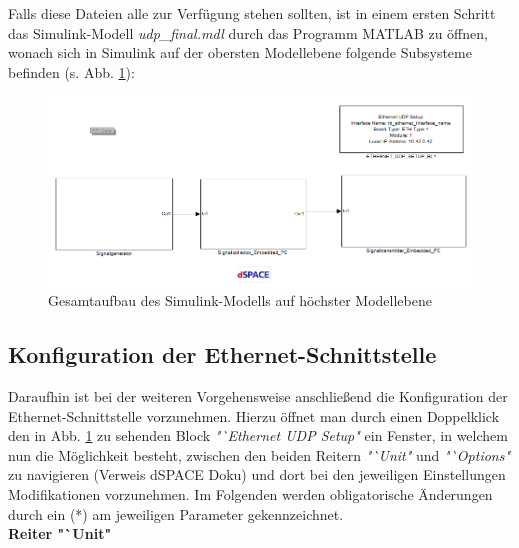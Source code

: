 \documentclass[fontsize = 12pt, paper = a4]{scrreprt}
\begin{document}
Falls diese Dateien alle zur Verfügung stehen sollten, ist in einem ersten Schritt das Simulink-Modell \textit{udp\_final.mdl} durch das Programm MATLAB zu öffnen, wonach sich in Simulink auf der obersten Modellebene  folgende Subsysteme befinden (s. Abb. \ref{topmodell}):

\begin{figure}[h]
\centering
\includegraphics[scale = 0.65]{topmodell}
\caption[Gesamtaufbau Simulink-Modell]{Gesamtaufbau des Simulink-Modells auf höchster Modellebene}
\label{topmodell}
\end{figure} 

\newpage


\subsection{Konfiguration der Ethernet-Schnittstelle}

Daraufhin ist bei der weiteren Vorgehensweise anschließend die Konfiguration der Ethernet-Schnittstelle vorzunehmen. Hierzu öffnet man durch einen Doppelklick den in Abb. \ref{topmodell} zu sehenden Block \textit{"`Ethernet UDP Setup"} ein Fenster, in welchem nun die Möglichkeit besteht, zwischen den beiden Reitern \textit{"`Unit"} und \textit{"`Options"} zu navigieren (Verweis dSPACE Doku) und dort bei den jeweiligen Einstellungen Modifikationen vorzunehmen. Im Folgenden werden obligatorische Änderungen durch ein (*) am jeweiligen Parameter gekennzeichnet. \\

\textbf{Reiter "`Unit"} 
\end{document}
